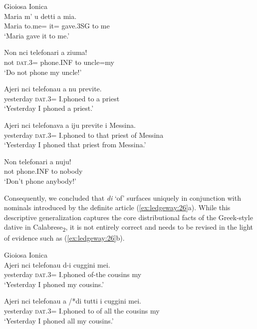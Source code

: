 \documentclass[output=paper,modfonts,nonflat,colorlinks,citecolor=brown]{langsci/langscibook}
\begin{document}
\ea\label{ex:ledgeway:25}
  Gioiosa Ionica\\
\ea
	\gll Maria  m’  u  detti  a  mia.\\
    Maria  to.me=  it=  gave.3SG   to  me\\
    \glt `Maria gave it to me.'

\ex
	\gll Non  nci  telefonari  a  ziuma!\\
      not  \textsc{dat}.3=  phone.INF   to  uncle=my\\
      \glt `Do not phone my uncle!'

\ex
	\gll Ajeri  nci  telefonau  a   nu   previte.\\
      yesterday  \textsc{dat}.3=  I.phoned    to   a    priest \\
      \glt `Yesterday I phoned a priest.'

\ex
	\gll Ajeri  nci   telefonava  a  iju    previte   i   Messina.\\
      yesterday  \textsc{dat}.3=  I.phoned  to  that   priest   of   Messina\\
      \glt `Yesterday I phoned that priest from Messina.'

\ex
	\gll Non  telefonari  a  nuju!\\
    not  phone.INF   to  nobody\\
    \glt `Don’t phone anybody!'
    \z
    \z

Consequently, we concluded that \textit{di} ‘of’ surfaces uniquely in conjunction with nominals introduced by the definite article (\ref{ex:ledgeway:26}a). While this descriptive generalization captures the core distributional facts of the Greek-style dative in Calabrese\textsubscript{2}, it is not entirely correct and needs to be revised in the light of evidence such as (\ref{ex:ledgeway:26}b).

\ea\label{ex:ledgeway:26}
  Gioiosa Ionica\\
\ea
	\gll Ajeri  nci  telefonau  d-i     cuggini   mei.\\
      yesterday  \textsc{dat}.3=  I.phoned  of-the  cousins   my\\
      \glt `Yesterday I phoned my cousins.'

\ex
	\gll Ajeri  nci  telefonau  a /*di  tutti   i     cuggini   mei.\\
      yesterday  \textsc{dat}.3=  I.phoned  to   of  all   the   cousins   my\\
      \glt `Yesterday I phoned all my cousins.'
      \z
      \z
\end{document}
